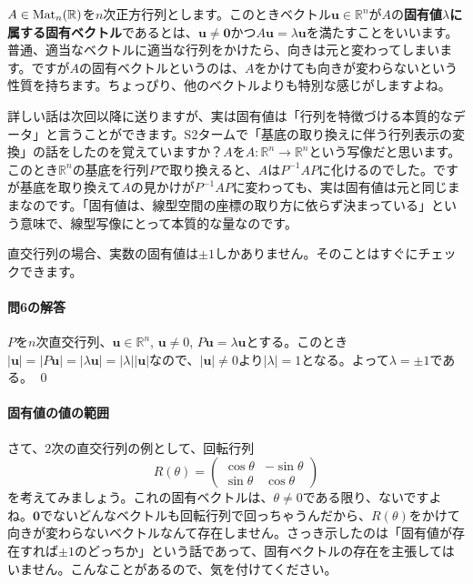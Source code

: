 $A \in \operatorname{Mat}_n(\mathbb{R})$を$n$次正方行列とします。このときベクトル$\bm{u} \in \mathbb{R}^n$が$A$の\textbf{固有値$\lambda$に属する固有ベクトル}であるとは、$\bm{u} \neq \bm{0}$かつ$A\bm{u} = \lambda \bm{u}$を満たすことをいいます。普通、適当なベクトルに適当な行列をかけたら、向きは元と変わってしまいます。ですが$A$の固有ベクトルというのは、$A$をかけても向きが変わらないという性質を持ちます。ちょっぴり、他のベクトルよりも特別な感じがしますよね。

詳しい話は次回以降に送りますが、実は固有値は「行列を特徴づける本質的なデータ」と言うことができます。S2タームで「基底の取り換えに伴う行列表示の変換」の話をしたのを覚えていますか？$A$を$A\colon \mathbb{R}^n \rightarrow \mathbb{R}^n$という写像だと思います。このとき$\mathbb{R}^n$の基底を行列$P$で取り換えると、$A$は$P^{-1}AP$に化けるのでした。ですが基底を取り換えて$A$の見かけが$P^{-1}AP$に変わっても、実は固有値は元と同じままなのです。「固有値は、線型空間の座標の取り方に依らず決まっている」という意味で、線型写像にとって本質的な量なのです。

直交行列の場合、実数の固有値は$\pm1$しかありません。そのことはすぐにチェックできます。

\paragraph{問6の解答}

$P$を$n$次直交行列、$\bm{u} \in \mathbb{R}^n$, $\bm{u} \neq 0$, $P\bm{u} = \lambda \bm{u}$とする。このとき$|\bm{u}| = |P \bm{u}| = |\lambda \bm{u}| = |\lambda||\bm{u}|$なので、$|\bm{u}| \neq 0$より$|\lambda| = 1$となる。よって$\lambda = \pm1$である。 \qed

\paragraph{固有値の値の範囲}

さて、$2$次の直交行列の例として、回転行列
\[
R(\theta) 
=
\begin{pmatrix}
\cos \theta & - \sin \theta \\
\sin \theta & \cos \theta
\end{pmatrix}
\]
を考えてみましょう。これの固有ベクトルは、$\theta \neq 0$である限り、ないですよね。$\bm{0}$でないどんなベクトルも回転行列で回っちゃうんだから、$R(\theta)$をかけて向きが変わらないベクトルなんて存在しません。さっき示したのは「固有値が存在すれば$\pm1$のどっちか」という話であって、固有ベクトルの存在を主張してはいません。こんなことがあるので、気を付けてください。

